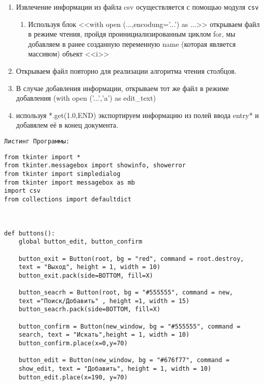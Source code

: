 \documentclass[a4paper]{article}
\begin{document}
\begin{lab1}
\begin{algoritm}
\begin{enumerate}
            \begin{enumerate}
                \item 
                    при вызове нового окна, мы показываем необходимое окно в помощью *.deiconify(), и устанавливаем фокус *.focus\_set()
            \end{enumerate}
            \item 
                Извлечение информации из файла csv осуществляется с помощью модуля \texttt{csv}
            \begin{enumerate}
                \item 
                    Используя блок <<with open (...,encodung='...') as ...>> открываем файл в режиме чтения, пройдя проинициализированным циклом for, мы добавляем в ранее созданную переменную name (которая является массивом) объект <<i>>
            \end{enumerate}
            \item
                Открываем файл повторно для реализации алгоритма чтения столбцов.
            \item В случае добавления информации, открываем тот же файл в режиме добавления (with open ('...','a') as edit\_text)
            \item используя *.get(1.0,END) экспортируем информацию из полей ввода entry* и добавялем её в конец документа.
        \end{enumerate}
    \end{algoritm}
        \texttt{Листинг Программы:}
    \begin{verbatim}
from tkinter import *
from tkinter.messagebox import showinfo, showerror
from tkinter import simpledialog
from tkinter import messagebox as mb
import csv
from collections import defaultdict



def buttons():
    global button_edit, button_confirm

    button_exit = Button(root, bg = "red", command = root.destroy,
    text = "Выход", height = 1, width = 10)
    button_exit.pack(side=BOTTOM, fill=X)

    button_seacrh = Button(root, bg = "#555555", command = new, 
    text ="Поиск/Добавить" , height =1, width = 15)
    button_seacrh.pack(side=BOTTOM, fill=X)

    button_confirm = Button(new_window, bg = "#555555", command = 
    search, text = "Искать",height = 1, width = 10)
    button_confirm.place(x=0,y=70)

    button_edit = Button(new_window, bg = "#676f77", command = 
    show_edit, text = "Добавить", height = 1, width = 10)
    button_edit.place(x=190, y=70)


\end{verbatim}
\end{lab1}
\end{document}
